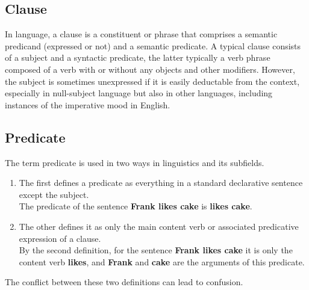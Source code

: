 \subsection{Clause \cite{wiki-clause}}\label{Language: Clause}
In language, a clause is a constituent or phrase that comprises a semantic predicand (expressed or not) and a semantic predicate. A typical clause consists of a subject and a syntactic predicate, the latter typically a verb phrase composed of a verb with or without any objects and other modifiers. However, the subject is sometimes unexpressed if it is easily deductable from the context, especially in null-subject language but also in other languages, including instances of the imperative mood in English.

\subsection{Predicate \cite{wiki-Predicate}}\label{Language: Predicate}
The term predicate is used in two ways in linguistics and its subfields. 
\begin{enumerate}
    \item The first defines a predicate as everything in a standard declarative sentence except the subject.\\
    The predicate of the sentence \textbf{Frank likes cake} is \textbf{likes cake}.

    \item The other defines it as only the main content verb or associated predicative expression of a clause.\\
    By the second definition, for the sentence \textbf{Frank likes cake} it is only the content verb \textbf{likes}, and \textbf{Frank} and \textbf{cake} are the arguments of this predicate.    
\end{enumerate}

The conflict between these two definitions can lead to confusion.


